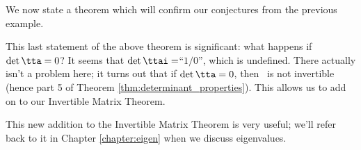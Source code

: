 \medskip

We now state a theorem which will confirm our conjectures from the previous example. 

\smallskip


\smallskip

This last statement of the above theorem is significant: what happens if $\det{\tta} = 0$? It seems that $\det{\ttai} = $``$1/0$'', which is undefined. There actually isn't a problem here; it turns out that if $\det{\tta}=0$, then \tta\ is not invertible (hence part 5 of Theorem \ref{thm:determinant_properties}). This allows us to add on to our Invertible Matrix Theorem.

\smallskip


\smallskip

This new addition to the Invertible Matrix Theorem is very useful; we'll refer back to it in Chapter \ref{chapter:eigen} when we discuss eigenvalues.\\


